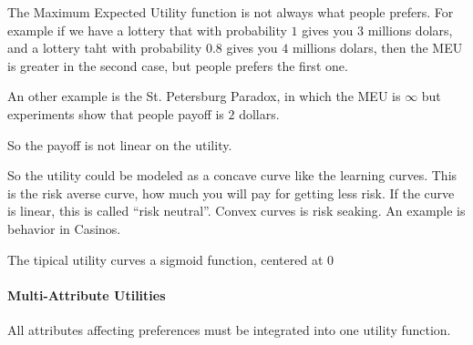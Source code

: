
The Maximum Expected Utility function is not always what people prefers.
For example if we have a lottery that with probability $1$ gives you $3$ millions dolars, and a lottery taht with probability $0.8$ gives you $4$ millions dolars, then the MEU is greater in the second case, but people prefers the first one.

\vspace{0.3cm}

An other example is the St. Petersburg Paradox, in which the MEU is $\infty$ but experiments show that people payoff is $2$ dollars.

\vspace{0.3cm}

\begin{framed}
 \centering
So the payoff is not linear on the utility.
 \end{framed}

 So the utility could be modeled as a concave curve like the learning curves.
 This is the risk averse curve, how much you will pay for getting less risk.
 If the curve is linear, this is called ``risk neutral''.
 Convex curves is risk seaking. An example is behavior in Casinos.
 
 
 \vspace{0.3cm}
 
 The tipical utility curves a sigmoid function, centered at 0
 
 \paragraph{Multi-Attribute Utilities}
 
 All attributes affecting preferences must be integrated into one utility function. 
 
 
 
 
